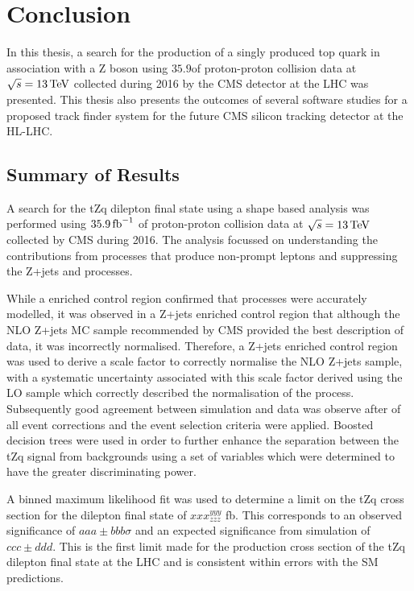 \chapter{Conclusion}\label{chapter:conclusion}
In this thesis, a search for the production of a singly produced top quark in association with a Z boson using $35.9$\fbinv of proton-proton collision data at $\sqrt{s} = 13\,\text{Te\hspace{-.08em}V}$ collected during 2016 by the CMS detector at the LHC was presented.
This thesis also presents the outcomes of several software studies for a proposed track finder system for the future CMS silicon tracking detector at the HL-LHC.

\section{Summary of Results}
A search for the tZq dilepton final state using a shape based analysis was performed using $35.9\mbox{\ensuremath{\,\text{fb}^\text{$-$1}}}$ of proton-proton collision data at $\sqrt{s} = 13\,\text{Te\hspace{-.08em}V}$ collected by CMS during 2016.
The analysis focussed on understanding the contributions from processes that produce non-prompt leptons and suppressing the Z+jets and \ttbar processes.

While a \ttbar enriched control region confirmed that \ttbar processes were accurately modelled, it was observed in a Z+jets enriched control region that although the NLO Z+jets MC sample recommended by CMS provided the best description of data, it was incorrectly normalised.
Therefore, a Z+jets enriched control region was used to derive a scale factor to correctly normalise the NLO Z+jets sample, with a systematic uncertainty associated with this scale factor derived using the LO sample which correctly described the normalisation of the process.
Subsequently good agreement between simulation and data was observe after of all event corrections and the event selection criteria were applied. 
Boosted decision trees were used in order to further enhance the separation between the tZq signal from backgrounds using a set of variables which were determined to have the greater discriminating power.

A binned maximum likelihood fit was used to determine a limit on the tZq cross section for the dilepton final state of $xxx^{yyy}_{zzz}$ fb.
This corresponds to an observed significance of $aaa \pm bbb \sigma$ and an expected significance from simulation of $ccc \pm ddd$. 
This is the first limit made for the production cross section of the tZq dilepton final state at the LHC and is consistent within errors with the SM predictions.

